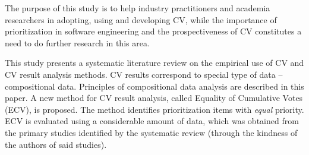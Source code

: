 The purpose of this study is to help industry practitioners and academia researchers in adopting, using and developing CV, while the importance of prioritization in software engineering and the prospectiveness of CV constitutes a need to do further research in this area.

This study presents a systematic literature review on the empirical use of CV and CV result analysis methods.
CV results correspond to special type of data -- compositional data. Principles of compositional data analysis are described in this paper.
A new method for CV result analysis, called Equality of Cumulative Votes (ECV), is proposed.
The method identifies prioritization items with \emph{equal} priority.
ECV is evaluated using a considerable amount of data, which was obtained from the primary studies identified by the systematic review (through the kindness of the authors of said studies).

